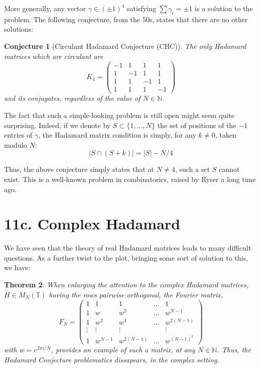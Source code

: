 \documentclass[12pt]{amsbook}
\newtheorem{theorem}{Theorem}[chapter]
\newtheorem{conjecture}[theorem]{Conjecture}
\begin{document}
More generally, any vector $\gamma\in(\pm 1)^4$ satisfying $\sum\gamma_i=\pm 1$ is a solution to the problem. The following conjecture, from the 50s, states that there are no other solutions:


\begin{conjecture}[Circulant Hadamard Conjecture (CHC)]
The only Hadamard matrices which are circulant are
$$K_4=\begin{pmatrix}-1&1&1&1\\ 1&-1&1&1\\ 1&1&-1&1\\ 1&1&1&-1\end{pmatrix}$$
and its conjugates, regardless of the value of $N\in\mathbb N$.
\end{conjecture}

The fact that such a simple-looking problem is still open might seem quite surprising. Indeed, if we denote by $S\subset\{1,\ldots,N\}$ the set of positions of the $-1$ entries of $\gamma$, the Hadamard matrix condition is simply, for any $k\neq 0$, taken modulo $N$:
$$|S\cap(S+k)|=|S|-N/4$$ 

Thus, the above conjecture simply states that at $N\neq 4$, such a set $S$ cannot exist. This is a well-known problem in combinatorics, raised by Ryser a long time ago.

\section*{11c. Complex Hadamard}

We have seen that the theory of real Hadamard matrices leads to many difficult questions. As a further twist to the plot, bringing some sort of solution to this, we have:


\begin{theorem}
When enlarging the attention to the complex Hadamard matrices, $H\in M_N(\mathbb T)$ having the rows pairwise orthogonal, the Fourier matrix,
$$F_N=
\begin{pmatrix}
1&1&1&\ldots&1\\
1&w&w^2&\ldots&w^{N-1}\\
1&w^2&w^4&\ldots&w^{2(N-1)}\\
\vdots&\vdots&\vdots&&\vdots\\
1&w^{N-1}&w^{2(N-1)}&\ldots&w^{(N-1)^2}
\end{pmatrix}$$
with $w=e^{2\pi i/N}$, provides an example of such a matrix, at any $N\in\mathbb N$. Thus, the Hadamard Conjecture problematics dissapears, in the complex setting.
\end{theorem}
\end{document}

